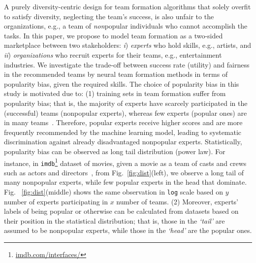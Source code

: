 \documentclass[runningheads]{llncs}
\begin{document}
A purely diversity-centric design for team formation algorithms that solely overfit to satisfy diversity, neglecting the team's success, is also unfair to the organizations, e.g., a team of \textit{non}popular individuals who cannot accomplish the tasks. In this paper, we propose to model team formation as a two-sided marketplace between two stakeholders: \textit{i}) \textit{experts} who hold skills, e.g., artists, and \textit{ii}) \textit{organizations} who recruit experts for their teams, e.g., entertainment industries. We investigate the trade-off between success rate (utility) and fairness in the recommended teams by neural team formation methods in terms of popularity bias, given the required skills. The choice of popularity bias in this study is motivated due to: (1) training sets in team formation suffer from popularity bias; that is, the majority of experts have scarcely participated in the (successful) teams (nonpopular experts), whereas few experts (popular ones) are in many teams~\cite{DBLP:conf/cikm/RadFKSB20,DBLP:conf/cikm/DashtiSF22}. Therefore, popular experts receive higher scores and are more frequently recommended by the machine learning model, leading to systematic discrimination against already disadvantaged nonpopular experts. Statistically, popularity bias can be observed as long tail distribution (power law). For instance, in \texttt{imdb}\footnote{\href{https://imdb.com/interfaces/}{imdb.com/interfaces/}} dataset of movies, given a movie as a team of casts and crews such as actors and directors~\cite{DBLP:journals/tkde/KargarGSSZ22,kargar2011discovering}, from Fig.~\ref{fig:dist}(left), we observe a long tail of many nonpopular experts, while few popular experts in the head that dominate. Fig. ~\ref{fig:dist}(middle) shows the same observation in \texttt{log} scale based on $y$ number of experts participating in $x$ number of teams. (2) Moreover, experts' labels of being popular or otherwise can be calculated from datasets based on their position in the statistical distribution; that is, those in the \textit{`tail'} are assumed to be nonpopular experts, while those in the \textit{`head'} are the popular ones.  
\end{document}
